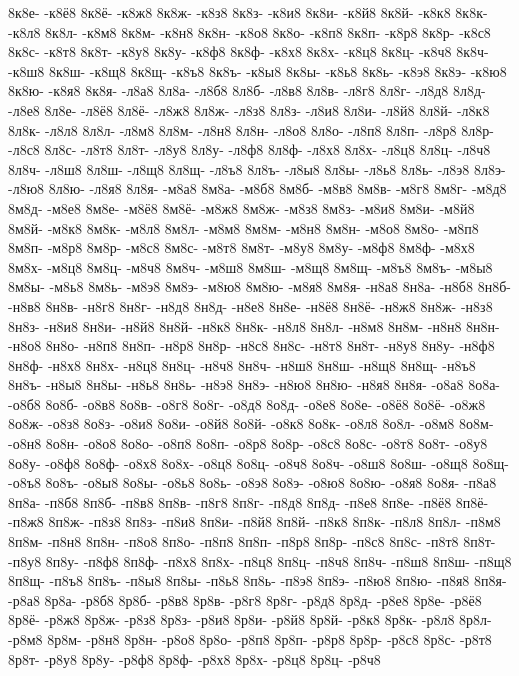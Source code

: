 {8к8е-
-к8ё8
8к8ё-
-к8ж8
8к8ж-
-к8з8
8к8з-
-к8и8
8к8и-
-к8й8
8к8й-
-к8к8
8к8к-
-к8л8
8к8л-
-к8м8
8к8м-
-к8н8
8к8н-
-к8о8
8к8о-
-к8п8
8к8п-
-к8р8
8к8р-
-к8с8
8к8с-
-к8т8
8к8т-
-к8у8
8к8у-
-к8ф8
8к8ф-
-к8х8
8к8х-
-к8ц8
8к8ц-
-к8ч8
8к8ч-
-к8ш8
8к8ш-
-к8щ8
8к8щ-
-к8ъ8
8к8ъ-
-к8ы8
8к8ы-
-к8ь8
8к8ь-
-к8э8
8к8э-
-к8ю8
8к8ю-
-к8я8
8к8я-
-л8а8
8л8а-
-л8б8
8л8б-
-л8в8
8л8в-
-л8г8
8л8г-
-л8д8
8л8д-
-л8е8
8л8е-
-л8ё8
8л8ё-
-л8ж8
8л8ж-
-л8з8
8л8з-
-л8и8
8л8и-
-л8й8
8л8й-
-л8к8
8л8к-
-л8л8
8л8л-
-л8м8
8л8м-
-л8н8
8л8н-
-л8о8
8л8о-
-л8п8
8л8п-
-л8р8
8л8р-
-л8с8
8л8с-
-л8т8
8л8т-
-л8у8
8л8у-
-л8ф8
8л8ф-
-л8х8
8л8х-
-л8ц8
8л8ц-
-л8ч8
8л8ч-
-л8ш8
8л8ш-
-л8щ8
8л8щ-
-л8ъ8
8л8ъ-
-л8ы8
8л8ы-
-л8ь8
8л8ь-
-л8э8
8л8э-
-л8ю8
8л8ю-
-л8я8
8л8я-
-м8а8
8м8а-
-м8б8
8м8б-
-м8в8
8м8в-
-м8г8
8м8г-
-м8д8
8м8д-
-м8е8
8м8е-
-м8ё8
8м8ё-
-м8ж8
8м8ж-
-м8з8
8м8з-
-м8и8
8м8и-
-м8й8
8м8й-
-м8к8
8м8к-
-м8л8
8м8л-
-м8м8
8м8м-
-м8н8
8м8н-
-м8о8
8м8о-
-м8п8
8м8п-
-м8р8
8м8р-
-м8с8
8м8с-
-м8т8
8м8т-
-м8у8
8м8у-
-м8ф8
8м8ф-
-м8х8
8м8х-
-м8ц8
8м8ц-
-м8ч8
8м8ч-
-м8ш8
8м8ш-
-м8щ8
8м8щ-
-м8ъ8
8м8ъ-
-м8ы8
8м8ы-
-м8ь8
8м8ь-
-м8э8
8м8э-
-м8ю8
8м8ю-
-м8я8
8м8я-
-н8а8
8н8а-
-н8б8
8н8б-
-н8в8
8н8в-
-н8г8
8н8г-
-н8д8
8н8д-
-н8е8
8н8е-
-н8ё8
8н8ё-
-н8ж8
8н8ж-
-н8з8
8н8з-
-н8и8
8н8и-
-н8й8
8н8й-
-н8к8
8н8к-
-н8л8
8н8л-
-н8м8
8н8м-
-н8н8
8н8н-
-н8о8
8н8о-
-н8п8
8н8п-
-н8р8
8н8р-
-н8с8
8н8с-
-н8т8
8н8т-
-н8у8
8н8у-
-н8ф8
8н8ф-
-н8х8
8н8х-
-н8ц8
8н8ц-
-н8ч8
8н8ч-
-н8ш8
8н8ш-
-н8щ8
8н8щ-
-н8ъ8
8н8ъ-
-н8ы8
8н8ы-
-н8ь8
8н8ь-
-н8э8
8н8э-
-н8ю8
8н8ю-
-н8я8
8н8я-
-о8а8
8о8а-
-о8б8
8о8б-
-о8в8
8о8в-
-о8г8
8о8г-
-о8д8
8о8д-
-о8е8
8о8е-
-о8ё8
8о8ё-
-о8ж8
8о8ж-
-о8з8
8о8з-
-о8и8
8о8и-
-о8й8
8о8й-
-о8к8
8о8к-
-о8л8
8о8л-
-о8м8
8о8м-
-о8н8
8о8н-
-о8о8
8о8о-
-о8п8
8о8п-
-о8р8
8о8р-
-о8с8
8о8с-
-о8т8
8о8т-
-о8у8
8о8у-
-о8ф8
8о8ф-
-о8х8
8о8х-
-о8ц8
8о8ц-
-о8ч8
8о8ч-
-о8ш8
8о8ш-
-о8щ8
8о8щ-
-о8ъ8
8о8ъ-
-о8ы8
8о8ы-
-о8ь8
8о8ь-
-о8э8
8о8э-
-о8ю8
8о8ю-
-о8я8
8о8я-
-п8а8
8п8а-
-п8б8
8п8б-
-п8в8
8п8в-
-п8г8
8п8г-
-п8д8
8п8д-
-п8е8
8п8е-
-п8ё8
8п8ё-
-п8ж8
8п8ж-
-п8з8
8п8з-
-п8и8
8п8и-
-п8й8
8п8й-
-п8к8
8п8к-
-п8л8
8п8л-
-п8м8
8п8м-
-п8н8
8п8н-
-п8о8
8п8о-
-п8п8
8п8п-
-п8р8
8п8р-
-п8с8
8п8с-
-п8т8
8п8т-
-п8у8
8п8у-
-п8ф8
8п8ф-
-п8х8
8п8х-
-п8ц8
8п8ц-
-п8ч8
8п8ч-
-п8ш8
8п8ш-
-п8щ8
8п8щ-
-п8ъ8
8п8ъ-
-п8ы8
8п8ы-
-п8ь8
8п8ь-
-п8э8
8п8э-
-п8ю8
8п8ю-
-п8я8
8п8я-
-р8а8
8р8а-
-р8б8
8р8б-
-р8в8
8р8в-
-р8г8
8р8г-
-р8д8
8р8д-
-р8е8
8р8е-
-р8ё8
8р8ё-
-р8ж8
8р8ж-
-р8з8
8р8з-
-р8и8
8р8и-
-р8й8
8р8й-
-р8к8
8р8к-
-р8л8
8р8л-
-р8м8
8р8м-
-р8н8
8р8н-
-р8о8
8р8о-
-р8п8
8р8п-
-р8р8
8р8р-
-р8с8
8р8с-
-р8т8
8р8т-
-р8у8
8р8у-
-р8ф8
8р8ф-
-р8х8
8р8х-
-р8ц8
8р8ц-
-р8ч8
}
